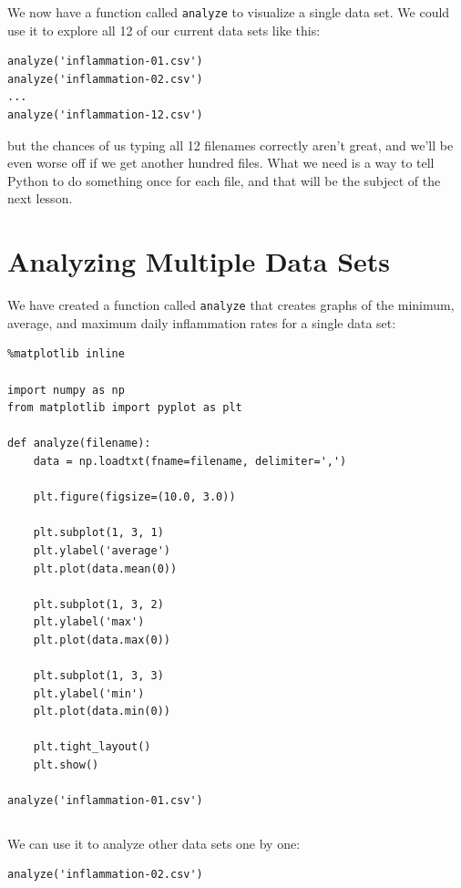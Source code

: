 \documentclass{book}
\begin{document}
We now have a function called \texttt{analyze} to visualize a single
data set. We could use it to explore all 12 of our current data sets
like this:

\begin{verbatim}
analyze('inflammation-01.csv')
analyze('inflammation-02.csv')
...
analyze('inflammation-12.csv')
\end{verbatim}

but the chances of us typing all 12 filenames correctly aren't great,
and we'll be even worse off if we get another hundred files. What we
need is a way to tell Python to do something once for each file, and
that will be the subject of the next lesson.

\section{Analyzing Multiple Data Sets}

We have created a function called \texttt{analyze} that creates graphs
of the minimum, average, and maximum daily inflammation rates for a
single data set:

\begin{verbatim}
%matplotlib inline

import numpy as np
from matplotlib import pyplot as plt

def analyze(filename):
    data = np.loadtxt(fname=filename, delimiter=',')

    plt.figure(figsize=(10.0, 3.0))

    plt.subplot(1, 3, 1)
    plt.ylabel('average')
    plt.plot(data.mean(0))

    plt.subplot(1, 3, 2)
    plt.ylabel('max')
    plt.plot(data.max(0))

    plt.subplot(1, 3, 3)
    plt.ylabel('min')
    plt.plot(data.min(0))

    plt.tight_layout()
    plt.show()

analyze('inflammation-01.csv')
\end{verbatim}

\begin{verbatim}
\end{verbatim}

We can use it to analyze other data sets one by one:

\begin{verbatim}
analyze('inflammation-02.csv')
\end{verbatim}

\begin{verbatim}
\end{verbatim}
\end{document}
